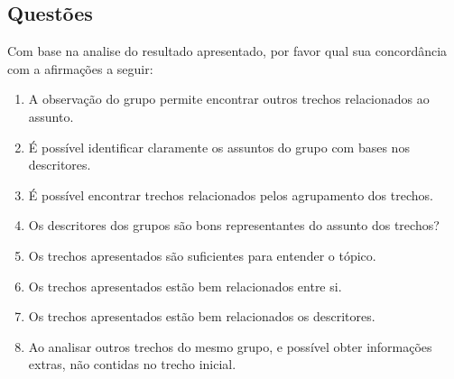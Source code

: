 \newpage

\subsection*{Questões}


Com base na analise do resultado apresentado, por favor qual sua concordância com a afirmações a seguir:





\begin{enumerate}

\item A observação do grupo permite encontrar outros trechos relacionados ao assunto.
\likert

\item É possível identificar claramente os assuntos do grupo com bases nos descritores.
\likert

\item É possível encontrar trechos relacionados pelos agrupamento dos trechos.
\likert

\item Os descritores dos grupos são bons representantes do assunto dos trechos?
\likert

\item Os trechos apresentados são suficientes para entender o tópico.
\likert

\item Os trechos apresentados estão bem relacionados entre si.
\likert

\item Os trechos apresentados estão bem relacionados os descritores.
\likert

\item Ao analisar outros trechos do mesmo grupo, e possível obter informações extras, não contidas no trecho inicial.
\likert


\end{enumerate}







